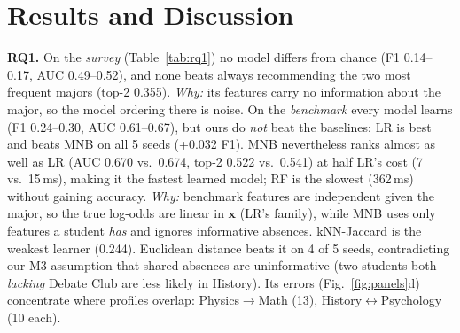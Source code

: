 \documentclass[sigconf]{acmart}
\newcommand{\RQ}[1]{\textbf{RQ#1}}
\begin{document}
\begin{table}[t]
\caption{\RQ1: final-test results, mean over 5 seeds (macro-F1 $\pm$ std). Bold: best per column; chance: F1 0.167, top-2 0.333, AUC 0.5.}\label{tab:rq1}
\footnotesize
{}
\end{table}



\section{Results and Discussion}
\textbf{\RQ1.} On the \emph{survey} (Table~\ref{tab:rq1}) no model differs from chance (F1 0.14--0.17, AUC 0.49--0.52), and none beats always recommending the two most frequent majors (top-2 0.355). \emph{Why:} its features carry no information about the major, so the model ordering there is noise. On the \emph{benchmark} every model learns (F1 0.24--0.30, AUC 0.61--0.67), but ours do \emph{not} beat the baselines: LR is best and beats MNB on all 5 seeds (+0.032 F1). MNB nevertheless ranks almost as well as LR (AUC 0.670 vs.\ 0.674, top-2 0.522 vs.\ 0.541) at half LR's cost (7 vs.\ 15\,ms), making it the fastest learned model; RF is the slowest (362\,ms) without gaining accuracy. \emph{Why:} benchmark features are independent given the major, so the true log-odds are linear in $\mathbf{x}$ (LR's family), while MNB uses only features a student \emph{has} and ignores informative absences. kNN-Jaccard is the weakest learner (0.244). Euclidean distance beats it on 4 of 5 seeds, contradicting our M3 assumption that shared absences are uninformative (two students both \emph{lacking} Debate Club are less likely in History). Its errors (Fig.~\ref{fig:panels}d) concentrate where profiles overlap: Physics$\to$Math (13), History$\leftrightarrow$Psychology (10 each).
\end{document}
